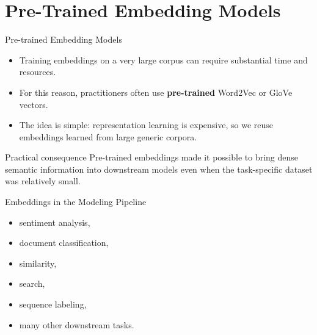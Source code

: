 \documentclass[11pt,aspectratio=169,professionalfonts]{beamer}
\begin{document}
\section{Pre-Trained Embedding Models}
%
\begin{frame}{Pre-trained Embedding Models}
\begin{itemize}
    \item Training embeddings on a very large corpus can require substantial time and resources.
    \item For this reason, practitioners often use \textbf{pre-trained} Word2Vec or GloVe vectors.
    \item The idea is simple: representation learning is expensive, so we reuse embeddings learned from large generic corpora.
\end{itemize}

\vspace{0.2cm}
\begin{block}{Practical consequence}
Pre-trained embeddings made it possible to bring dense semantic information into downstream models even when the task-specific dataset was relatively small.
\end{block}
\end{frame}
%
%
\begin{frame}{Embeddings in the Modeling Pipeline}
\begin{center}
\end{center}

\vspace{0.2cm}
\begin{itemize}
    \item sentiment analysis,
    \item document classification,
    \item similarity,
    \item search,
    \item sequence labeling,
    \item many other downstream tasks.
\end{itemize}
\end{frame}
%
\end{document}
